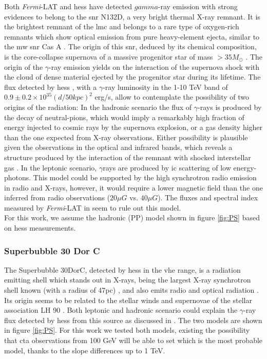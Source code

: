 \documentclass[main.tex]{subfiles}
\begin{document}
Both \textit{Fermi}-LAT and \gls{hess} have detected $gamma$-ray emission with strong evidences to belong to the \gls{snr} N132D, a very bright thermal X-ray remnant. It is the brightest remnant of the \gls{lmc} and belongs to a rare type of oxygen-rich remnants which show optical emission from pure heavy-element ejecta, similar to the \gls{mw} \gls{snr} Cas A \cite{2007N132D}. The origin of this \gls{snr}, deduced by its chemical composition, is the core-collapse supernova of a massive progenitor star of mass $> 35 M_{\odot}$ \cite{2007N132D}. The origin of the $\gamma$-ray emission yields on the interaction of the supernova shock with the cloud of dense material ejected by the progenitor star during its lifetime. The flux detected by \gls{hess} \cite{2015HESSTeVLMC}, with a $\gamma$-ray luminosity in the 1-10 TeV band of $0.9 \pm 0.2 \times 10^{35}(d/50kpc)^2$ erg/s, allow to contemplate the possibility of two origins of the radiation: In the hadronic scenario the flux of $\gamma$-rays is produced by the decay of neutral-pions, which would imply a remarkably high fraction of energy injected to cosmic rays by the supernova explosion, or a gas density higher than the one expected from X-ray observations. Either possibility is plausible given the observations in the optical and infrared bands, which reveals a structure produced by the interaction of the remnant with shocked interstellar gas \cite{2006shockn132D}. In the leptonic scenario, $\gamma$rays are produced by \gls{ic} scattering of low energy-photons. This model could be supported by the high synchrotron radio emission in radio and X-rays, however, it would require a lower magnetic field than the one inferred from radio observations ($20 \mu G$ vs. $40\mu G$). The fluxes and spectral index measured by \textit{Fermi}-LAT in \cite{2016LMCFermiLAT} seem to rule out this model.\\
For this work, we assume the hadronic (PP) model shown in figure \ref{fig:PS} based on \gls{hess} measurements.


\subsubsection{Superbubble 30 Dor C}

The Superbubble 30DorC, detected by \gls{hess} in the \gls{vhe} range, is a radiation emitting shell which stands out in X-rays, being the largest X-ray synchrotron shell known (with a radius of 47pc) \cite{200430dorcxrays}, and also emits radio and optical radiation \cite{1985SNRsintheLMC30dorc}. Its origin seems to be related to the stellar winds and supernovae of the stellar association LH 90 \cite{198430dorLH90}. Both leptonic and hadronic scenario could explain the $\gamma$-ray flux detected by \gls{hess} from this source as discussed in \cite{2015HESSTeVLMC}. The two models are shown in figure \ref{fig:PS}. For this work we tested both models, existing the possibility that \gls{cta} observations from 100 GeV will be able to set which is the most probable model, thanks to the slope differences up to 1 TeV.
\end{document}
